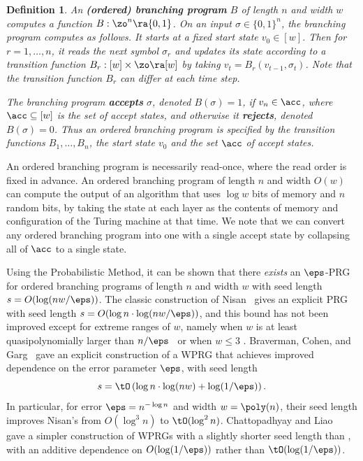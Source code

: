 \documentclass[11pt]{article}
\newtheorem{definition}[theorem]{Definition}
\begin{document}
	\begin{definition} \label{def:obp}
	An \textbf{(ordered) branching program} $B$ of length $n$ and width $w$ computes a function $B:\zo^n \ra \{0,1\}$. On an input $\sigma\in\{0,1\}^n$, the branching program computes as follows. It starts at a fixed start state $v_0\in [w]$. Then for $r=1,\ldots,n$, it reads the next symbol $\sigma_r$ and updates its state according to a transition function $B_r:[w]\times \zo\ra[w]$ by taking $v_{t}=B_r(v_{t-1},\sigma_t)$. Note that the transition function $B_r$ can differ at each time step. 
	
	The branching program \textbf{accepts} $\sigma$, denoted $B(\sigma)=1$, if $v_{n}\in \acc$, where $\acc \subseteq [w]$ is the set of accept states, and otherwise it \textbf{rejects}, denoted $B(\sigma)=0$.
	Thus an ordered branching program is specified by the transition functions $B_1,\ldots,B_n$, the start state $v_0$ and the set $\acc$ of accept states.
	\end{definition}
	An ordered branching program is necessarily read-once, where the read order is fixed in advance.
	An ordered branching program of length $n$ and width $O(w)$ can compute the output of an algorithm that uses $\log w$ bits of memory and $n$ random bits, by taking the state at each layer as the contents of memory and configuration of the Turing machine at that time.  We note that we can convert any ordered branching program into one with a single accept state by collapsing all of $\acc$ to a single state.
	
	Using the Probabilistic Method, it can be shown that there \emph{exists} an $\eps$-PRG for ordered branching programs of length $n$ and width $w$ with seed length
	$s=O(\log(nw/\eps))$.  The classic construction of Nisan~\cite{Nisan92} gives an explicit
	PRG with seed length $s = O(\log n \cdot \log(nw/\eps))$, and this bound has not been improved except for extreme ranges of $w$, namely when
	$w$ is at least quasipolynomially larger than $n/\eps$~\cite{NisanZu96,Armoni98,KaneNeWo08} or when $w\leq 3$ \cite{BogdanovDvVeYe09,SimaZa11,GopalanMeReTrVa12,MekaReTa18}.
	Braverman, Cohen, and Garg~\cite{BravermanCoGa18} gave an explicit construction of a WPRG that achieves improved dependence on the error parameter $\eps$, with seed length  $$s=\tO\left(\log n\cdot \log(nw) + \log(1/\eps)\right).$$
	In particular, for error $\eps=n^{-\log n}$ and width $w=\poly(n)$, their seed length improves Nisan's from $O(\log^3 n)$ to $\tO(\log^2 n)$.  
	Chattopadhyay %
    and Liao~\cite{ChattopadhyayLi20} gave a simpler construction of WPRGs with a slightly shorter seed length than \cite{BravermanCoGa18}, with an additive dependence on $O(\log(1/\eps))$ rather than $\tO(\log(1/\eps))$.
\end{document}
